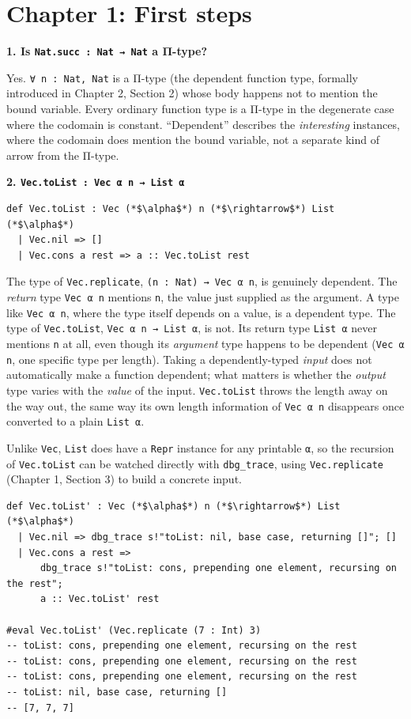 \section{Chapter 1: First steps}\label{sec:15-appendix-solutions:01-chapter-1:1}

\textbf{1. Is \texttt{Nat.succ : Nat → Nat} a Π-type?}

Yes. \texttt{∀ n : Nat, Nat} is a Π-type (the dependent function type, formally introduced in Chapter 2, Section 2) whose body happens not to mention the bound variable. Every ordinary function type is a Π-type in the degenerate case where the codomain is constant. ``Dependent'' describes the \emph{interesting} instances, where the codomain does mention the bound variable, not a separate kind of arrow from the Π-type.

\textbf{2. \texttt{Vec.toList : Vec α n → List α}}

\begin{lstlisting}
def Vec.toList : Vec (*$\alpha$*) n (*$\rightarrow$*) List (*$\alpha$*)
  | Vec.nil => []
  | Vec.cons a rest => a :: Vec.toList rest
\end{lstlisting}

The type of \texttt{Vec.replicate}, \texttt{(n : Nat) → Vec α n}, is genuinely dependent. The \emph{return} type \texttt{Vec α n} mentions \texttt{n}, the value just supplied as the argument. A type like \texttt{Vec α n}, where the type itself depends on a value, is a dependent type. The type of \texttt{Vec.toList}, \texttt{Vec α n → List α}, is not. Its return type \texttt{List α} never mentions \texttt{n} at all, even though its \emph{argument} type happens to be dependent (\texttt{Vec α n}, one specific type per length). Taking a dependently-typed \emph{input} does not automatically make a function dependent; what matters is whether the \emph{output} type varies with the \emph{value} of the input. \texttt{Vec.toList} throws the length away on the way out, the same way its own length information of \texttt{Vec α n} disappears once converted to a plain \texttt{List α}.

Unlike \texttt{Vec}, \texttt{List} does have a \texttt{Repr} instance for any printable \texttt{α}, so the recursion of \texttt{Vec.toList} can be watched directly with \texttt{dbg\_\allowbreak{}trace}, using \texttt{Vec.replicate} (Chapter 1, Section 3) to build a concrete input.

\begin{lstlisting}
def Vec.toList' : Vec (*$\alpha$*) n (*$\rightarrow$*) List (*$\alpha$*)
  | Vec.nil => dbg_trace s!"toList: nil, base case, returning []"; []
  | Vec.cons a rest =>
      dbg_trace s!"toList: cons, prepending one element, recursing on the rest";
      a :: Vec.toList' rest

#eval Vec.toList' (Vec.replicate (7 : Int) 3)
-- toList: cons, prepending one element, recursing on the rest
-- toList: cons, prepending one element, recursing on the rest
-- toList: cons, prepending one element, recursing on the rest
-- toList: nil, base case, returning []
-- [7, 7, 7]
\end{lstlisting}

